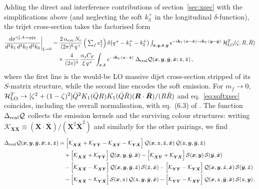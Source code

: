 \documentclass[11pt,a4paper]{article}
\newcommand{\calH}{\mathcal{H}}
\newcommand{\calQ}{\mathcal{Q}}
\newcommand{\calS}{\mathcal{S}}
\newcommand{\calK}{\mathcal{K}}
\newcommand{\vx}{\bm{x}}
\newcommand{\vy}{\bm{y}}
\newcommand{\vz}{\bm{z}}
\newcommand{\vxb}{\bar{\bm{x}}}
\newcommand{\vyb}{\bar{\bm{y}}}
\newcommand{\vzb}{\bar{\bm{z}}}
\newcommand{\vR}{\bm{R}}
\newcommand{\vY}{\bm{Y}}
\newcommand{\vX}{\bm{X}}
\newcommand{\vk}{\bm{k}}
\newcommand{\Qb}{\bar{Q}}
\numberwithin{equation}{section}
\begin{document}
Adding the direct and interference contributions of section~\ref{sec:xsec} with the
simplifications above (and neglecting the soft $k^{+}_{3}$ in the longitudinal
$\delta$-function), the trijet cross-section takes the factorised form
\begin{align}
\label{eq:softxsec}
\frac{d\sigma^{\gamma^*_TA\rightarrow q\bar qg}}{d^3k_1\,d^3k_2\,d^3k_3}
\bigg|_{\xi\to 0} &= \frac{2\,\alpha_{em}\,N_{c}}{(2\pi)^{6}\,q^{+}}\,
\Big(\textstyle\sum_{f} e^{2}_{f}\Big)\,\delta\big(q^{+}-k^{+}_{1}-k^{+}_{2}\big)
\int_{\vx,\vy,\vxb,\vyb} e^{-i\vk_{1}\cdot (\vx-\vxb)-i\vk_{2}\cdot(\vy-\vyb)}\;
\calH^{T}_{\rm LO}(\zeta;R,\bar R) \notag\\
&\quad\times \frac{4}{(2\pi)^{4}}\,\frac{\alpha_{s}C_{F}}{\xi\,q^{+}}
\int_{\vz,\vzb} e^{-i\vk_{3}\cdot(\vz-\vzb)}\;
\Delta_{\rm real}\calQ(\vx,\vy,\vyb,\vxb;\vz,\vzb)\,,
\end{align}
where the first line is the would-be LO massive dijet cross-section stripped of its
$S$-matrix structure, while the second line encodes the soft emission. For $m_f\to0$,
$\calH^{T}_{\rm LO}\to[\zeta^2+(1-\zeta)^2]\Qb^{2}K_1(\Qb R)K_1(\Qb\bar R)
(\vR\cdot\bar{\vR})/(R\bar R)$ and eq.~\eqref{eq:softxsec} coincides, including the overall
normalisation, with eq.~(6.3) of \cite{Iancu:2022gpw}. The function $\Delta_{\rm real}\calQ$
collects the emission kernels and the surviving colour structures: writing
$\calK_{\vX\bar{\vX}}\equiv({\vX\cdot\bar{\vX}})/({\vX^{2}\bar{\vX}^{2}})$ and similarly for
the other pairings, we find
\begin{align}
\label{eq:DeltaQ}
\Delta_{\rm real}\calQ(\vx,\vy,\vyb,\vxb;\vz,\vzb) &\equiv
\Big[\calK_{\vX\bar{\vX}}+\calK_{\vY\bar{\vY}}-\calK_{\vX\bar{\vY}}-\calK_{\vY\bar{\vX}}\Big]\,
\calQ(\vx,\vz,\vzb,\vxb)\,\calQ(\vz,\vy,\vyb,\vzb) \notag\\
&\quad +\Big[\calK_{\vX\bar{\vX}}+\calK_{\vY\bar{\vY}}\Big]\,\calQ(\vx,\vy,\vyb,\vxb)
-\Big[\calK_{\vX\bar{\vY}}+\calK_{\vY\bar{\vX}}\Big]\,\calS(\vx,\vy)\,\calS(\vyb,\vxb) \notag\\
&\quad -\Big[\calK_{\vX\bar{\vX}}-\calK_{\vX\bar{\vY}}\Big]\,
\calQ(\vx,\vy,\vyb,\vzb)\,\calS(\vzb,\vxb)
-\Big[\calK_{\vY\bar{\vY}}-\calK_{\vY\bar{\vX}}\Big]\,
\calQ(\vx,\vy,\vzb,\vxb)\,\calS(\vyb,\vzb) \notag\\
&\quad -\Big[\calK_{\vX\bar{\vX}}-\calK_{\vY\bar{\vX}}\Big]\,
\calS(\vx,\vz)\,\calQ(\vz,\vy,\vyb,\vxb)
-\Big[\calK_{\vY\bar{\vY}}-\calK_{\vX\bar{\vY}}\Big]\,
\calQ(\vx,\vz,\vyb,\vxb)\,\calS(\vz,\vy)\,.
\end{align}
\end{document}
